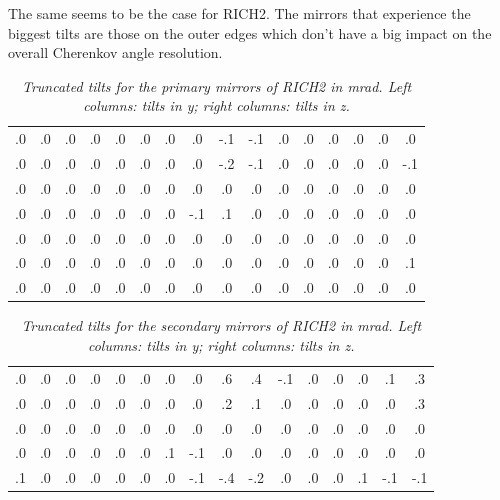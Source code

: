 The same seems to be the case for RICH2. The mirrors that experience the biggest tilts are those on the outer edges which don't have a big impact on the overall Cherenkov angle resolution.\\

 \begin{table}[!h]
	\begin{center}
		\begin{tabular}{c|c|c|c|c|c|c|c|c|c|c|c|c|c|c|c}
    .0  &  .0  &  .0  &  .0 &   .0  &  .0  &  .0  &  .0 & \qquad      -.1  & -.1  &  .0  &  .0  &  .0  &  .0  &  .0  &  .0 \\
    .0  &  .0  &  .0  &  .0 &   .0  &  .0  &  .0  &  .0 & \qquad      -.2  & -.1  &  .0  &  .0  &  .0  &  .0  &  .0  & -.1\\
    .0  &  .0  &  .0  &  .0 &   .0  &  .0  &  .0  &  .0  & \qquad      .0  &  .0  &  .0  &  .0  &  .0  &  .0  &  .0  &  .0\\
    .0  &  .0  &  .0   & .0 &   .0  &  .0  &  .0  & -.1  & \qquad      .1  &  .0  &  .0  &  .0  &  .0  &  .0  &  .0  &  .0\\
    .0  &  .0  &  .0   & .0 &   .0  &  .0  &  .0  &  .0 & \qquad       .0  &  .0  &  .0  &  .0  &  .0  &  .0  &  .0  &  .0\\
    .0  &  .0  &  .0   & .0 &   .0  &  .0  &  .0  &  .0  & \qquad      .0  &  .0  &  .0  &  .0  &  .0  &  .0  &  .0  &  .1\\
    .0   & .0  &  .0   & .0 &   .0  &  .0  &  .0  &  .0  & \qquad      .0  &  .0  &  .0  &  .0  &  .0  &  .0  &  .0  &  .0 \\
\end{tabular}
\end{center}
\caption{\textit{Truncated tilts for the primary mirrors of RICH2 in mrad. Left columns: tilts in y; right columns: tilts in z. }}
\end{table}


\begin{table}[!h]
	\begin{center}
		\begin{tabular}{c|c|c|c|c|c|c|c|c|c|c|c|c|c|c|c}
	.0  &  .0  &  .0   & .0  &  .0  &  .0  &  .0  &  .0   & \qquad     .6  &  .4  & -.1  &  .0  &  .0  &  .0  &  .1  &  .3\\
    .0  &  .0  &  .0   & .0  &  .0  &  .0  &  .0  &  .0   & \qquad     .2  &  .1  &  .0  &  .0  &  .0  &  .0  &  .0  &  .3\\
    .0  &  .0  &  .0   & .0  &  .0  &  .0  &  .0  &  .0   & \qquad     .0  &  .0  &  .0  &  .0  &  .0  &  .0  &  .0  &  .0\\
    .0  &  .0  &  .0   & .0  &  .0  &  .0  &  .1  & -.1   & \qquad     .0  &  .0  &  .0  &  .0  &  .0  &  .0  &  .0  &  .0\\
    .1  &  .0  &  .0   & .0  &  .0   & .0  &  .0  & -.1   & \qquad    -.4  & -.2  &  .0  &  .0  &  .0  &  .1  & -.1  & -.1\\
    \end{tabular}
\end{center}
\caption{\textit{Truncated tilts for the secondary mirrors of RICH2 in mrad. Left columns: tilts in y; right columns: tilts in z. }}
\end{table}
